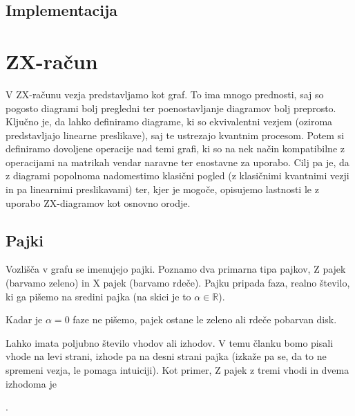 \documentclass[mat1]{fmfdelo}
\newcommand{\R}{\mathbb R}
\begin{document}
\subsection{Implementacija}


\section{ZX-račun}
V ZX-računu vezja predstavljamo kot graf. To ima mnogo prednosti, saj so pogosto diagrami bolj pregledni ter poenostavljanje diagramov bolj preprosto. Ključno je, da lahko definiramo diagrame, ki so ekvivalentni vezjem (oziroma predstavljajo linearne preslikave), saj te ustrezajo kvantnim procesom. Potem si definiramo dovoljene operacije nad temi grafi, ki so na nek način kompatibilne z operacijami na matrikah vendar naravne ter enostavne za uporabo. Cilj pa je, da z diagrami popolnoma nadomestimo klasični pogled (z klasičnimi kvantnimi vezji in pa linearnimi preslikavami) ter, kjer je mogoče, opisujemo lastnosti le z uporabo ZX-diagramov kot osnovno orodje.
\subsection{Pajki}
Vozlišča v grafu se imenujejo pajki. Poznamo dva primarna tipa pajkov, Z pajek (barvamo zeleno) in X pajek (barvamo rdeče). Pajku pripada faza, realno število, ki ga pišemo na sredini pajka (na skici je to \(\alpha\in\R\)).
\begin{center}
\end{center}
Kadar je \(\alpha = 0\) faze ne pišemo, pajek ostane le zeleno ali rdeče pobarvan disk.

Lahko imata poljubno število vhodov ali izhodov. V temu članku bomo pisali vhode na levi strani, izhode pa na desni strani pajka (izkaže pa se, da to ne spremeni vezja, le pomaga intuiciji). Kot primer, Z pajek z tremi vhodi in dvema izhodoma je

\begin{center}
  .
\end{center}
\end{document}
